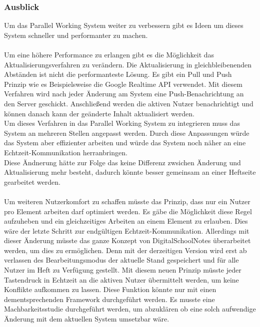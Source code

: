 \subsubsection{Ausblick}
Um das Parallel Working System weiter zu verbessern gibt es Ideen um dieses System schneller und performanter zu machen.\\
\\
Um eine höhere Performance zu erlangen gibt es die Möglichkeit das Aktualisierungsverfahren zu verändern. Die Aktualisierung in gleichbleibenenden Abständen ist nicht die performanteste Lösung. Es gibt ein Pull und Push Prinzip wie es Beispielsweise die Google Realtime API verwendet. Mit diesem Verfahren wird nach jeder Änderung am System eine Push-Benachrichtung an den Server geschickt. Anschließend werden die aktiven Nutzer benachrichtigt und können danach kann der geänderte Inhalt aktualisiert werden.\\
Um dieses Verfahren in das Parallel Working System zu integrieren muss das System an mehreren Stellen angepasst werden. Durch diese Anpassungen würde das System aber effizienter arbeiten und würde das System noch näher an eine Echtzeit-Kommunikation herranbringen.\\
Diese Ändnerung hätte zur Folge das keine Differenz zwsichen Änderung und Aktualisierung mehr besteht, dadurch könnte besser gemeinsam an einer Heftseite gearbeitet werden.\\
\\
Um weiteren Nutzerkomfort zu schaffen müsste das Prinzip, dass nur ein Nutzer pro Element arbeiten darf optimiert werden. Es gäbe die Möglichkeit diese Regel aufzuheben und ein gleichzeitiges Arbeiten an einem Element zu erlauben. Dies wäre der letzte Schritt zur endgültigen Echtzeit-Kommunikation. Allerdings mit dieser Änderung müsste das ganze Konzept von DigitalSchoolNotes überarbeitet werden, um dies zu ermöglichen. Denn mit der derzeitigen Version wird erst ab verlassen des Bearbeitungsmodus der aktuelle Stand gespeichert und für alle Nutzer im Heft zu Verfügung gestellt. Mit diesem neuen Prinzip müsste jeder Tastendruck in Echtzeit an die aktiven Nutzer übermittelt werden, um keine Konflikte aufkommen zu lassen. Diese Funktion könnte nur mit einen dementsprechenden Framework durchgeführt werden. Es musste eine Machbarkeitsstudie durchgeführt werden, um abzuklären ob eine solch aufwendige Änderung mit dem aktuellen System umsetzbar wäre. 
